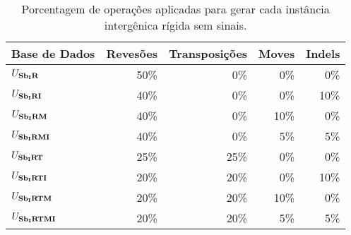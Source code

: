 \begin{table}[!htb]
  \caption{Porcentagem de operações aplicadas para gerar cada instância intergênica rígida sem sinais.}
  \label{table:GSGLMSJY}
  \centering
  \begin{tabular}{|p{3cm}|r|r|r|r|}
    \hline
    Base de Dados           & Revesões   & Transposições   & Moves   & Indels    \\ \hline
    $U_{\textbf{Sb\textsubscript{I}R}}{}$             & 50\%       & 0\%             &  0\%     &  0\%       \\ \hline
    $U_{\textbf{Sb\textsubscript{I}RI}}{}$            & 40\%       & 0\%             &  0\%     & 10\%       \\ \hline
    $U_{\textbf{Sb\textsubscript{I}RM}}{}$            & 40\%       & 0\%             & 10\%     &  0\%       \\ \hline
    $U_{\textbf{Sb\textsubscript{I}RMI}}{}$           & 40\%       & 0\%             &  5\%     &  5\%       \\ \hline
    $U_{\textbf{Sb\textsubscript{I}RT}}{}$            & 25\%       & 25\%            &  0\%     &  0\%       \\ \hline
    $U_{\textbf{Sb\textsubscript{I}RTI}}{}$           & 20\%       & 20\%            &  0\%     & 10\%       \\ \hline
    $U_{\textbf{Sb\textsubscript{I}RTM}}{}$           & 20\%       & 20\%            & 10\%     &  0\%       \\ \hline
    $U_{\textbf{Sb\textsubscript{I}RTMI}}{}$          & 20\%       & 20\%            &  5\%     &  5\%       \\ \hline
  \end{tabular}
\end{table}